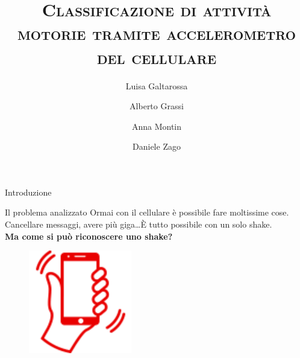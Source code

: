 \documentclass{beamer}
\title{\textsc{Classificazione di attività motorie tramite accelerometro del cellulare}}
\author{Luisa Galtarossa\and Alberto Grassi\and Anna Montin\and Daniele Zago}
\date{}
\newcommand{\separator}[1]{
\begin{frame}[sep]
\centering
\vspace*{\fill}
{\color{white}\huge #1}
\vspace*{\fill}
\end{frame}
}
\begin{document}
\begin{frame}
\titlepage
\end{frame}

\separator{Introduzione}

\begin{frame}{Il problema analizzato}
Ormai con il cellulare è possibile fare moltissime cose. 
Cancellare messaggi, avere più giga\dots È tutto possibile con un solo shake.\\
\smallskip
\textbf{Ma come si può riconoscere uno shake?}
\medskip
\begin{figure}[H]
\includegraphics[width=0.4\textwidth]{./images/vodafoneshake.png}
\end{figure}
\end{frame}
\end{document}
